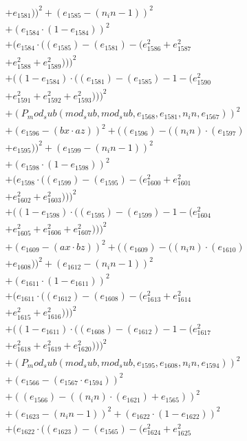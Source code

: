 \documentclass[10pt, a4paper]{article}
\begin{document}
\begin{align*}
& + e_{1581}))^{2} + (e_{1585} - (n_in - 1))^{2} \\
& + (e_{1584}  \cdot  (1 - e_{1584}))^{2} \\
& + (e_{1584}  \cdot  ((e_{1585}) - (e_{1581}) - (e_{1586}^{2} + e_{1587}^{2} \\
& + e_{1588}^{2} + e_{1589}^{2})))^{2} \\
& + ((1 - e_{1584})  \cdot  ((e_{1581}) - (e_{1585}) - 1 - (e_{1590}^{2} \\
& + e_{1591}^{2} + e_{1592}^{2} + e_{1593}^{2})))^{2} \\
& + (P_mod_sub(mod_sub, mod_sub, e_{1568}, e_{1581}, n_in, e_{1567}))^{2} \\
& + (e_{1596} - (bx  \cdot  az))^{2} + ((e_{1596}) - ((n_in)  \cdot  (e_{1597}) \\
& + e_{1595}))^{2} + (e_{1599} - (n_in - 1))^{2} \\
& + (e_{1598}  \cdot  (1 - e_{1598}))^{2} \\
& + (e_{1598}  \cdot  ((e_{1599}) - (e_{1595}) - (e_{1600}^{2} + e_{1601}^{2} \\
& + e_{1602}^{2} + e_{1603}^{2})))^{2} \\
& + ((1 - e_{1598})  \cdot  ((e_{1595}) - (e_{1599}) - 1 - (e_{1604}^{2} \\
& + e_{1605}^{2} + e_{1606}^{2} + e_{1607}^{2})))^{2} \\
& + (e_{1609} - (ax  \cdot  bz))^{2} + ((e_{1609}) - ((n_in)  \cdot  (e_{1610}) \\
& + e_{1608}))^{2} + (e_{1612} - (n_in - 1))^{2} \\
& + (e_{1611}  \cdot  (1 - e_{1611}))^{2} \\
& + (e_{1611}  \cdot  ((e_{1612}) - (e_{1608}) - (e_{1613}^{2} + e_{1614}^{2} \\
& + e_{1615}^{2} + e_{1616}^{2})))^{2} \\
& + ((1 - e_{1611})  \cdot  ((e_{1608}) - (e_{1612}) - 1 - (e_{1617}^{2} \\
& + e_{1618}^{2} + e_{1619}^{2} + e_{1620}^{2})))^{2} \\
& + (P_mod_sub(mod_sub, mod_sub, e_{1595}, e_{1608}, n_in, e_{1594}))^{2} \\
& + (e_{1566} - (e_{1567}  \cdot  e_{1594}))^{2} \\
& + ((e_{1566}) - ((n_in)  \cdot  (e_{1621}) + e_{1565}))^{2} \\
& + (e_{1623} - (n_in - 1))^{2} + (e_{1622}  \cdot  (1 - e_{1622}))^{2} \\
& + (e_{1622}  \cdot  ((e_{1623}) - (e_{1565}) - (e_{1624}^{2} + e_{1625}^{2} \\

\end{align*}
\end{document}
